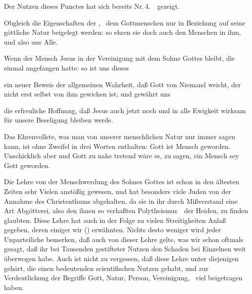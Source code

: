 \begin{aufza}
\item Der Nutzen dieses Punctes hat sich bereits Nr.\,4.\ \ gezeigt.
\item Obgleich die Eigenschaften der , \usw\ dem Gottmenschen nur in Beziehung auf seine göttliche Natur beigelegt werden: so ehren sie doch auch den Menschen in ihm, und also uns Alle.
\item Wenn der Mensch Jesus  in der Vereinigung mit dem Sohne Gottes bleibt, die einmal angefangen hatte: so ist uns dieses 
\begin{aufzb}
\item ein neuer Beweis der allgemeinen Wahrheit, daß Gott von Niemand weicht, der nicht erst selbst von ihm gewichen ist; und gewährt uns
\item die erfreuliche Hoffnung, daß Jesus auch jetzt noch und in alle Ewigkeit wirksam für unsere Beseligung bleiben werde.
\end{aufzb}
\item Das Ehrenvollste, was man von unserer menschlichen Natur nur immer sagen kann, ist ohne Zweifel in drei Worten enthalten: Gott ist Mensch geworden. Unschicklich aber und Gott zu nahe tretend wäre es, zu sagen, ein Mensch sey Gott geworden.
\end{aufza}

Die Lehre von der Menschwerdung des Sohnes Gottes ist schon in den ältesten Zeiten sehr Vielen anstößig gewesen, und hat besonders viele Juden von der Annahme des Christenthums abgehalten, da sie in ihr durch Mißverstand eine Art Abgötterei, also den ihnen so verhaßten Polytheismus~\ der Heiden, zu finden glaubten. Diese Lehre hat auch in der Folge zu vielen Streitigkeiten Anlaß gegeben, deren einiger wir () erwähnten. Nichts desto weniger wird jeder Unparteiliche bemerken, daß auch von dieser Lehre gelte, was wir schon oftmals gesagt, daß ihr bei Tausenden gestifteter Nutzen den Schaden bei Einzelnen weit überwogen habe. Auch ist nicht zu vergessen, daß diese Lehre unter diejenigen gehört, die einen bedeutenden scientifischen Nutzen gehabt, und zur Verdeutlichung der Begriffe Gott, Natur, Person, Vereinigung, \usw\ viel beigetragen haben.

